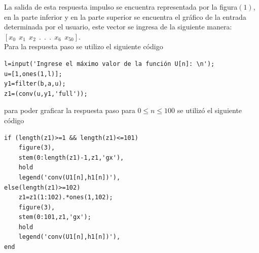 \documentclass[onecolumn]{IEEEtran}
\begin{document}
\noindent
La salida de esta respuesta impulso se encuentra representada por la figura$(1)$, en la parte inferior y en la parte superior se encuentra el gráfico de la entrada determinada por el usuario, este vector se ingresa de la siguiente manera: $[x_0 \ \ x_1 \ \ x_2\ \ . \ \ . \ \ . \ \ x_6 \ \ x_{50}]$.\\
Para la respuesta paso se utilizo el siguiente código
\begin{verbatim}
l=input('Ingrese el máximo valor de la función U[n]: \n');
u=[1,ones(1,l)];
y1=filter(b,a,u);
z1=(conv(u,y1,'full'));
\end{verbatim}
\noindent
para poder graficar la respuesta paso para $0 \le n \le 100$ se utilizó el siguiente código
\begin{verbatim}
if (length(z1)>=1 && length(z1)<=101)
	figure(3),
	stem(0:length(z1)-1,z1,'gx'),
    hold
    legend('conv(U1[n],h1[n])'),
else(length(z1)>=102)
	z1=z1(1:102).*ones(1,102);
	figure(3),
	stem(0:101,z1,'gx');
    hold
    legend('conv(U1[n],h1[n])'),
end
\end{verbatim}
\end{document}
